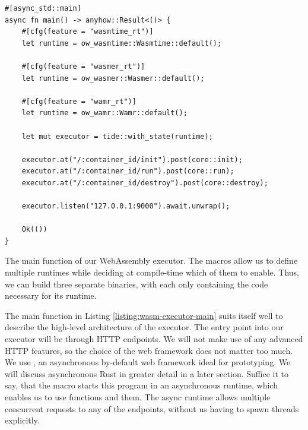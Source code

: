 \begin{listing}[ht]
    \begin{verbatim}
#[async_std::main]
async fn main() -> anyhow::Result<()> {
    #[cfg(feature = "wasmtime_rt")]
    let runtime = ow_wasmtime::Wasmtime::default();

    #[cfg(feature = "wasmer_rt")]
    let runtime = ow_wasmer::Wasmer::default();

    #[cfg(feature = "wamr_rt")]
    let runtime = ow_wamr::Wamr::default();

    let mut executor = tide::with_state(runtime);

    executor.at("/:container_id/init").post(core::init);
    executor.at("/:container_id/run").post(core::run);
    executor.at("/:container_id/destroy").post(core::destroy);

    executor.listen("127.0.0.1:9000").await.unwrap();

    Ok(())
}
\end{verbatim}
    \caption{The main function of our WebAssembly executor. The \inl{\#[cfg(feature = "...")]} macros allow us to define multiple runtimes while deciding at compile-time which of them to enable. Thus, we can build three separate binaries, with each only containing the code necessary for its runtime.}
    \label{listing:wasm-executor-main}
\end{listing}

The main function in Listing \ref{listing:wasm-executor-main} suits itself well to describe the high-level architecture of the executor. The entry point into our executor will be through HTTP endpoints. We will not make use of any advanced HTTP features, so the choice of the web framework does not matter too much. We use  \cite{Turon2021}, an asynchronous by-default web framework ideal for prototyping. We will discuss asynchronous Rust in greater detail in a later section. Suffice it to say, that the  macro starts this program in an asynchronous runtime, which enables us to use  functions and  them. The async runtime allows multiple concurrent requests to any of the endpoints, without us having to spawn threads explicitly.

